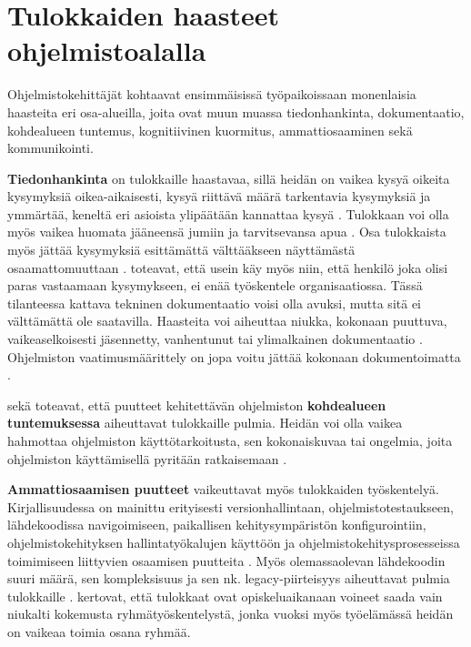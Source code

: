 \documentclass[utf8]{gradu3}
\begin{document}
\section{Tulokkaiden haasteet ohjelmistoalalla}
\label{luku-tulokkaiden-haasteet}

Ohjelmistokehittäjät kohtaavat ensimmäisissä työpaikoissaan monenlaisia haasteita eri osa-alueilla, joita ovat muun muassa tiedonhankinta, dokumentaatio, kohdealueen tuntemus, kognitiivinen kuormitus, ammattiosaaminen sekä kommunikointi. 

\textbf{Tiedonhankinta} on tulokkaille haastavaa, sillä heidän on vaikea kysyä oikeita kysymyksiä oikea-aikaisesti, kysyä riittävä määrä tarkentavia kysymyksiä ja ymmärtää, keneltä eri asioista ylipäätään kannattaa kysyä %
\parencites%
    {ju-ym-2021}%
    {britto-ym-2019}%
    {craig-ym-2018}%
    {matturro-ym-2017}%
    {dagenais-ym-2010}%
    {begel-simon-2008}%
\relax
%
. Tulokkaan voi olla myös vaikea huomata jääneensä jumiin ja tarvitsevansa apua \parencite{begel-simon-2008}. Osa tulokkaista myös jättää  kysymyksiä esittämättä välttääkseen näyttämästä osaamattomuuttaan 
\parencites%
    {radermacher-ym-2015}%
    {begel-simon-2008}%
\relax.
%
\textcite{dagenais-ym-2010} toteavat, että usein käy myös niin, että henkilö joka olisi paras vastaamaan kysymykseen, ei enää työskentele organisaatiossa. Tässä tilanteessa kattava tekninen dokumentaatio voisi olla avuksi, mutta sitä ei välttämättä ole saatavilla. Haasteita voi aiheuttaa niukka, kokonaan puuttuva, vaikeaselkoisesti jäsennetty, vanhentunut tai ylimalkainen dokumentaatio %
\parencites%
    {matturro-ym-2017}%
    {dagenais-ym-2010}%
    {begel-simon-2008}%
\relax
. Ohjelmiston vaatimusmäärittely on jopa voitu jättää kokonaan dokumentoimatta \parencite{matturro-ym-2017}.

\textcite{matturro-ym-2017} sekä \textcite{dagenais-ym-2010} toteavat, että puutteet kehitettävän ohjelmiston \textbf{kohdealueen tuntemuksessa} aiheuttavat tulokkaille pulmia. Heidän voi olla vaikea hahmottaa ohjelmiston käyttötarkoitusta, sen kokonaiskuvaa tai ongelmia, joita ohjelmiston käyttämisellä pyritään ratkaisemaan \parencite{matturro-ym-2017}.

\textbf{Ammattiosaamisen puutteet} vaikeuttavat myös tulokkaiden työskentelyä. Kirjallisuudessa
on mainittu erityisesti versionhallintaan, ohjelmistotestaukseen, lähdekoodissa navigoimiseen, paikallisen kehitysympäristön konfigurointiin, ohjelmistokehityksen hallintatyökalujen käyttöön ja ohjelmistokehitysprosesseissa toimimiseen liittyvien osaamisen puutteita  %
\parencites%
    {craig-ym-2018}%
    {matturro-ym-2017}%
    {dagenais-ym-2010}%
    {begel-simon-2008}%
\relax
% 
. Myös olemassaolevan lähdekoodin suuri määrä, sen kompleksisuus ja sen nk. legacy-piirteisyys aiheuttavat pulmia tulokkaille %
\parencites%
    {britto-ym-2019}%
    {viviani-murphy-2019}%
    {craig-ym-2018}
    {begel-simon-2008}%
\relax.
\textcite{craig-ym-2018} kertovat, että tulokkaat ovat opiskeluaikanaan voineet saada vain niukalti kokemusta ryhmätyöskentelystä, jonka vuoksi myös työelämässä heidän on vaikeaa toimia osana ryhmää.
\end{document}
